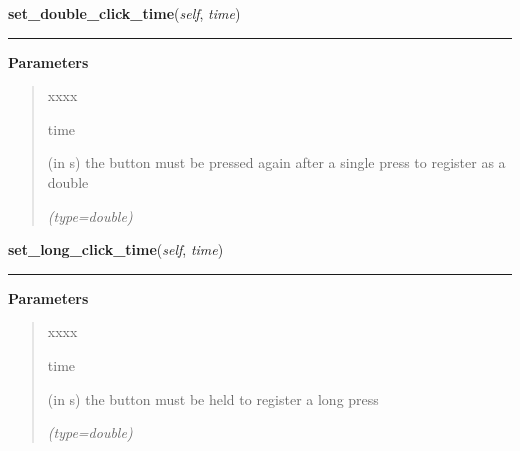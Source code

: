 \hspace{.8\funcindent}\begin{boxedminipage}{\funcwidth}

    \raggedright \textbf{set\_double\_click\_time}(\textit{self}, \textit{time})

    \vspace{-1.5ex}

    \rule{\textwidth}{0.5\fboxrule}
\setlength{\parskip}{2ex}
\setlength{\parskip}{1ex}
      \textbf{Parameters}
      \vspace{-1ex}

      \begin{quote}
        \begin{Ventry}{xxxx}

          \item[time]

          (in s) the button must be pressed again after a single press to 
          register as a double

            {\it (type=double)}

        \end{Ventry}

      \end{quote}

    \end{boxedminipage}

    \label{PowerMateEventHandler:PowerMateEventHandler:set_long_click_time}

    \vspace{0.5ex}

\hspace{.8\funcindent}\begin{boxedminipage}{\funcwidth}

    \raggedright \textbf{set\_long\_click\_time}(\textit{self}, \textit{time})

    \vspace{-1.5ex}

    \rule{\textwidth}{0.5\fboxrule}
\setlength{\parskip}{2ex}
\setlength{\parskip}{1ex}
      \textbf{Parameters}
      \vspace{-1ex}

      \begin{quote}
        \begin{Ventry}{xxxx}

          \item[time]

          (in s) the button must be held to register a long press

            {\it (type=double)}

        \end{Ventry}

      \end{quote}

    \end{boxedminipage}

